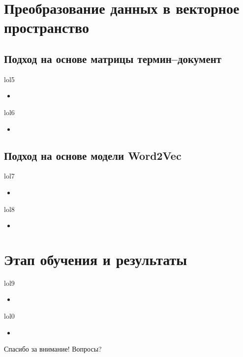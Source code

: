 \documentclass{beamer}
\begin{document}
\section{Преобразование данных в векторное пространство}

\subsection{Подход на основе матрицы термин--документ}

\begin{frame}{lol5}
  \begin{itemize}
      \item {}
  \end{itemize}
\end{frame}

\begin{frame}{lol6}
  \begin{itemize}
      \item {}
  \end{itemize}
\end{frame}

\subsection{Подход на основе модели Word2Vec}

\begin{frame}{lol7}
  \begin{itemize}
      \item {}
  \end{itemize}
\end{frame}

\begin{frame}{lol8}
  \begin{itemize}
      \item {}
  \end{itemize}
\end{frame}

\section{Этап обучения и результаты}

\begin{frame}{lol9}
  \begin{itemize}
      \item {}
  \end{itemize}
\end{frame}

\begin{frame}{lol0}
  \begin{itemize}
      \item {}
  \end{itemize}
\end{frame}

\begin{frame}[plain,c]
    \begin{center}
        \Huge Спасибо за внимание! Вопросы?
    \end{center}
\end{frame}
\end{document}
